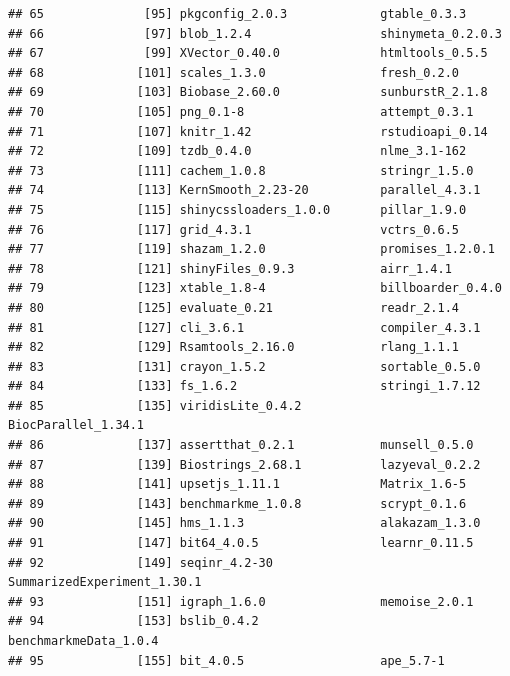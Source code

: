 \documentclass[
]{article}
\begin{document}
\begin{verbatim}
## 65              [95] pkgconfig_2.0.3             gtable_0.3.3               
## 66              [97] blob_1.2.4                  shinymeta_0.2.0.3          
## 67              [99] XVector_0.40.0              htmltools_0.5.5            
## 68             [101] scales_1.3.0                fresh_0.2.0                
## 69             [103] Biobase_2.60.0              sunburstR_2.1.8            
## 70             [105] png_0.1-8                   attempt_0.3.1              
## 71             [107] knitr_1.42                  rstudioapi_0.14            
## 72             [109] tzdb_0.4.0                  nlme_3.1-162               
## 73             [111] cachem_1.0.8                stringr_1.5.0              
## 74             [113] KernSmooth_2.23-20          parallel_4.3.1             
## 75             [115] shinycssloaders_1.0.0       pillar_1.9.0               
## 76             [117] grid_4.3.1                  vctrs_0.6.5                
## 77             [119] shazam_1.2.0                promises_1.2.0.1           
## 78             [121] shinyFiles_0.9.3            airr_1.4.1                 
## 79             [123] xtable_1.8-4                billboarder_0.4.0          
## 80             [125] evaluate_0.21               readr_2.1.4                
## 81             [127] cli_3.6.1                   compiler_4.3.1             
## 82             [129] Rsamtools_2.16.0            rlang_1.1.1                
## 83             [131] crayon_1.5.2                sortable_0.5.0             
## 84             [133] fs_1.6.2                    stringi_1.7.12             
## 85             [135] viridisLite_0.4.2           BiocParallel_1.34.1        
## 86             [137] assertthat_0.2.1            munsell_0.5.0              
## 87             [139] Biostrings_2.68.1           lazyeval_0.2.2             
## 88             [141] upsetjs_1.11.1              Matrix_1.6-5               
## 89             [143] benchmarkme_1.0.8           scrypt_0.1.6               
## 90             [145] hms_1.1.3                   alakazam_1.3.0             
## 91             [147] bit64_4.0.5                 learnr_0.11.5              
## 92             [149] seqinr_4.2-30               SummarizedExperiment_1.30.1
## 93             [151] igraph_1.6.0                memoise_2.0.1              
## 94             [153] bslib_0.4.2                 benchmarkmeData_1.0.4      
## 95             [155] bit_4.0.5                   ape_5.7-1
\end{verbatim}
\end{document}
